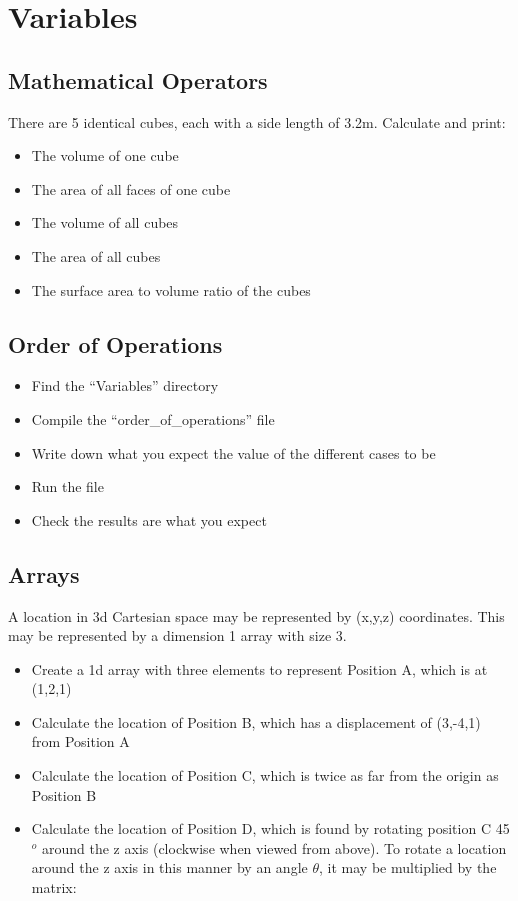 \documentclass[11pt,a4paper]{article}
\begin{document}
\section{Variables}

\subsection{Mathematical Operators}
There are 5 identical cubes, each with a side length of 3.2m. Calculate and print:

\begin{itemize}
    \item The volume of one cube
    \item The area of all faces of one cube
    \item The volume of all cubes
    \item The area of all cubes
    \item The surface area to volume ratio of the cubes
\end{itemize}

\subsection{Order of Operations}
\begin{itemize}
    \item Find the “Variables” directory
    \item Compile the “order\_of\_operations” file
    \item Write down what you expect the value of the different cases to be
    \item Run the file
    \item Check the results are what you expect
\end{itemize}

\subsection{Arrays}
A location in 3d Cartesian space may be represented by (x,y,z) coordinates. This may be represented by a dimension 1 array with size 3.

\begin{itemize}
    \item Create a 1d array with three elements to represent Position A, which is at (1,2,1)
    \item Calculate the location of Position B, which has a displacement of (3,-4,1) from Position A
    \item Calculate the location of Position C, which is twice as far from the origin as Position B
    \item Calculate the location of Position D, which is found by rotating position C 45$^{o}$ around the z axis (clockwise when viewed from above). To rotate a location around the z axis in this manner by an angle $\theta$, it may be multiplied by the matrix:
\end{itemize}
\end{document}
